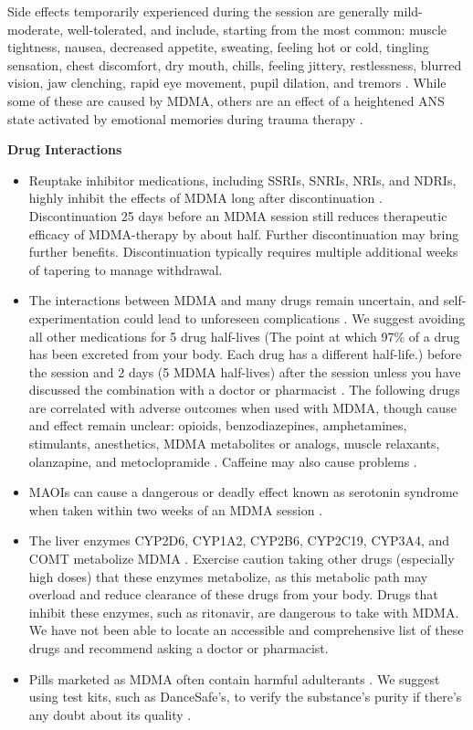 \documentclass[12pt,letterpaper]{article}
\begin{document}
Side effects temporarily experienced during the session are generally mild-moderate, well-tolerated, and include, starting from the most common: muscle tightness, nausea, decreased appetite, sweating, feeling hot or cold, tingling sensation, chest discomfort, dry mouth, chills, feeling jittery, restlessness, blurred vision, jaw clenching, rapid eye movement, pupil dilation, and tremors \cite{mitchellMDMAClinicalTrial2}. While some of these are caused by MDMA, others are an effect of a heightened ANS state activated by emotional memories during trauma therapy \cite{kozlowskaDefenseCascade}.

\vspace{\baselineskip}

\noindent \textbf{Drug Interactions}
\begin{itemize}
    \item Reuptake inhibitor medications, including SSRIs, SNRIs, NRIs, and NDRIs, highly inhibit the effects of MDMA long after discontinuation \cite{feducciaSSRIDiscontinuation}. Discontinuation 25 days before an MDMA session still reduces therapeutic efficacy of MDMA-therapy by about half. Further discontinuation may bring further benefits. Discontinuation typically requires multiple additional weeks of tapering to manage withdrawal.
    \item The interactions between MDMA and many drugs remain uncertain, and self-experimentation could lead to unforeseen complications \cite{cohenMDMADrugCombinations,sarparastDrugInteractions}. We suggest avoiding all other medications for 5 drug half-lives (The point at which 97\% of a drug has been excreted from your body. Each drug has a different half-life.) before the session and 2 days (5 MDMA half-lives) after the session unless you have discussed the combination with a doctor or pharmacist \cite{andradeHalf,torrePharmacology}. The following drugs are correlated with adverse outcomes when used with MDMA, though cause and effect remain unclear: opioids, benzodiazepines, amphetamines, stimulants, anesthetics, MDMA metabolites or analogs, muscle relaxants, olanzapine, and metoclopramide \cite{cohenMDMADrugCombinations}. Caffeine may also cause problems \cite{vanattouCaffeine}.
    \item MAOIs can cause a dangerous or deadly effect known as serotonin syndrome when taken within two weeks of an MDMA session \cite{malcolmSerotonin,edinoffInteractions}.
    \item The liver enzymes CYP2D6, CYP1A2, CYP2B6, CYP2C19, CYP3A4, and COMT metabolize MDMA \cite{torreEnzymes,sarparastDrugInteractions}. Exercise caution taking other drugs (especially high doses) that these enzymes metabolize, as this metabolic path may overload and reduce clearance of these drugs from your body. Drugs that inhibit these enzymes, such as ritonavir, are dangerous to take with MDMA. We have not been able to locate an accessible and comprehensive list of these drugs and recommend asking a doctor or pharmacist.
    \item Pills marketed as MDMA often contain harmful adulterants \cite{saleemiAdulterants}. We suggest using test kits, such as DanceSafe's, to verify the substance's purity if there's any doubt about its quality \cite{danceSafeTestingKit}.
\end{itemize}
\end{document}
